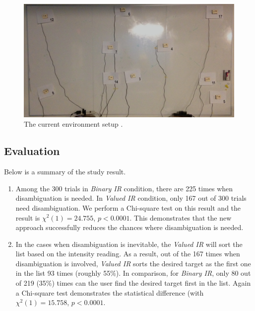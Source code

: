 \begin{figure}[t]
\centering
\includegraphics[width=0.9\columnwidth]{figures/study-layout2.jpg}
\caption{The current environment setup .}
\label{fig:study-layout2}
\end{figure}








\subsection{Evaluation}
Below is a summary of the study result.
\begin{enumerate}
\item Among the 300 trials in {\em Binary IR} condition, there are 225 times when disambiguation is needed. In {\em Valued IR} condition, only 167 out of 300 trials need disambiguation. We perform a Chi-square test on this result and the result is $\chi^2(1) = 24.755$, $p < 0.0001$. This demonstrates that the new approach successfully reduces the chances where disambiguation is needed.
\item In the cases when disambiguation is inevitable, the {\em Valued IR} will sort the list based on the intensity reading. As a result, out of the 167 times when disambiguation is involved, {\em Valued IR} sorts the desired target as the first one in the list 93 times (roughly 55\%). In comparison, for {\em Binary IR}, only 80 out of 219 (35\%) times can the user find the desired target first in the list. Again a Chi-square test demonstrates the statistical difference (with $\chi^2(1) = 15.758$, $p < 0.0001$. 
\end{enumerate}

